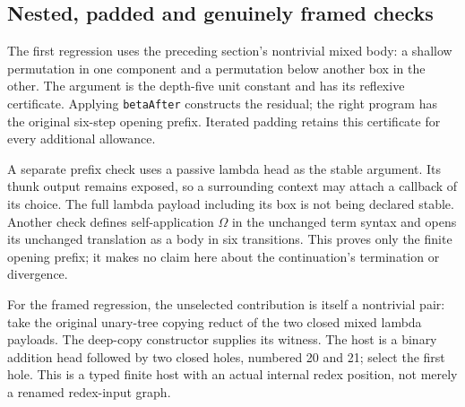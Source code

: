 
\subsection{Nested, padded and genuinely framed checks}
The first regression uses the preceding section's nontrivial mixed body:
a shallow permutation in one component and a permutation below another box
in the other. The argument is the depth-five unit constant and has its
reflexive certificate. Applying \texttt{betaAfter} constructs the residual;
the right program has the original six-step opening prefix. Iterated padding
retains this certificate for every additional allowance.


A separate prefix check uses a passive lambda head as the stable argument.
Its thunk output remains exposed, so a surrounding context may attach a
callback of its choice. The full lambda payload including its box is not
being declared stable. Another check defines self-application $\Omega$ in
the unchanged term syntax and opens its unchanged translation as a body in
six transitions. This proves only the finite opening prefix; it makes no
claim here about the continuation's termination or divergence.


For the framed regression, the unselected contribution is itself a
nontrivial pair: take the original unary-tree copying reduct of the two
closed mixed lambda payloads. The deep-copy constructor supplies its witness.
The host is a binary addition head followed by two closed holes, numbered
20 and 21; select the first hole. This is a typed finite host with an actual
internal redex position, not merely a renamed redex-input graph.

